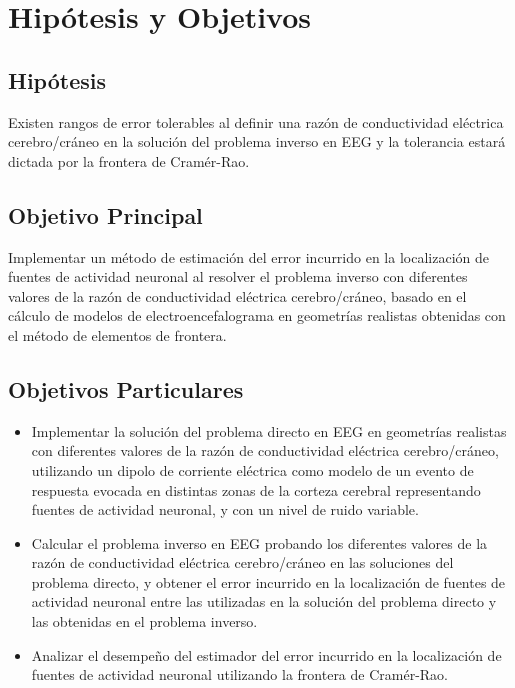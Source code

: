 %
\chapter{Hipótesis y Objetivos}
\label{sec:obj}

\section{Hipótesis}
\label{sec:obj:hipotesis}

Existen rangos de error tolerables al definir una razón de conductividad eléctrica cerebro/cráneo en la solución del problema inverso en EEG y la tolerancia estará dictada por la frontera de Cramér-Rao.

\section{Objetivo Principal}
\label{sec:obj:main}

Implementar un método de estimación del error incurrido en la localización de fuentes de actividad neuronal al resolver el problema inverso con diferentes valores de la razón de conductividad eléctrica cerebro/cráneo, basado en el cálculo de modelos de electroencefalograma en geometrías realistas obtenidas con el método de elementos de frontera.

\section{Objetivos Particulares}
\label{sec:obj:individual}

\begin{itemize}
	\item Implementar la solución del problema directo en EEG en geometrías realistas con diferentes valores de la razón de conductividad eléctrica cerebro/cráneo, utilizando un dipolo de corriente eléctrica como modelo de un evento de respuesta evocada en distintas zonas de la corteza cerebral representando fuentes de actividad neuronal, y con un nivel de ruido variable.
	\item Calcular el problema inverso en EEG probando los diferentes valores de la razón de conductividad eléctrica cerebro/cráneo en las soluciones del problema directo, y obtener el error incurrido en la localización de fuentes de actividad neuronal entre las utilizadas en la solución del problema directo y las obtenidas en el problema inverso.
	\item Analizar el desempeño del estimador del error incurrido en la localización de fuentes de actividad neuronal utilizando la frontera de Cramér-Rao.
\end{itemize}